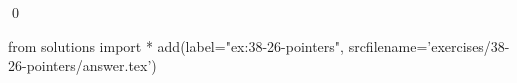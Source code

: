 
\begin{ex}
  \label{ex:38-26-pointers}
  
  \qed
\end{ex}
\begin{python0}
from solutions import *
add(label="ex:38-26-pointers",
    srcfilename='exercises/38-26-pointers/answer.tex')
\end{python0}

